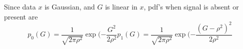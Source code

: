 Since data $x$ is Gaussian, and $G$ is linear in $x$, pdf's when signal is absent or present are
\begin{equation}
p_0(G)=\frac{1}{\sqrt{2\pi\rho^2}}\exp(-\frac{G^2}{2\rho^2}
p_1(G)=\frac{1}{\sqrt{2\pi\rho^2}}\exp(-\frac{(G-\rho^2)^2}{2\rho^2}
\end{equation}



